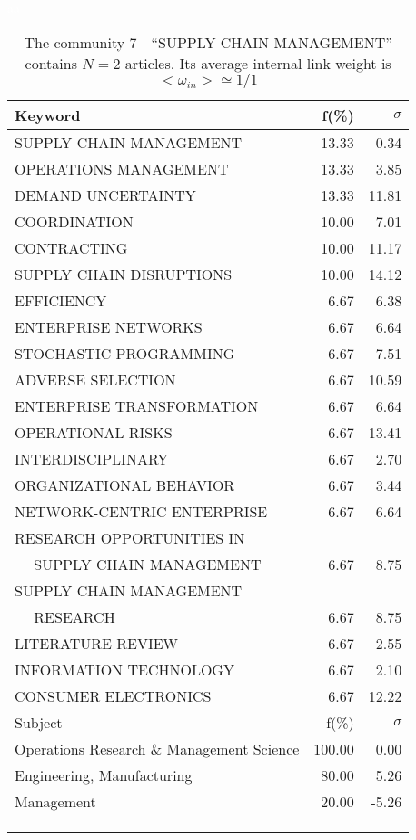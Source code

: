 \documentclass[a4paper,11pt]{report}
\begin{document}
\begin{landscape}
\begin{table}[!ht]
\caption{The community 7 - ``SUPPLY CHAIN MANAGEMENT'' contains $N = 2$ articles. Its average internal link weight is $<\omega_{in}> \simeq 1/1$ }
\textcolor{white}{aa}\\
{\scriptsize\begin{tabular}{|l r r|}
\hline
Keyword & f(\%) & $\sigma$\\
\hline
SUPPLY CHAIN MANAGEMENT & 13.33 & 0.34\\
OPERATIONS MANAGEMENT & 13.33 & 3.85\\
DEMAND UNCERTAINTY & 13.33 & 11.81\\
COORDINATION & 10.00 & 7.01\\
CONTRACTING & 10.00 & 11.17\\
SUPPLY CHAIN DISRUPTIONS & 10.00 & 14.12\\
EFFICIENCY & 6.67 & 6.38\\
ENTERPRISE NETWORKS & 6.67 & 6.64\\
STOCHASTIC PROGRAMMING & 6.67 & 7.51\\
ADVERSE SELECTION & 6.67 & 10.59\\
ENTERPRISE TRANSFORMATION & 6.67 & 6.64\\
OPERATIONAL RISKS & 6.67 & 13.41\\
INTERDISCIPLINARY & 6.67 & 2.70\\
ORGANIZATIONAL BEHAVIOR & 6.67 & 3.44\\
NETWORK-CENTRIC ENTERPRISE & 6.67 & 6.64\\
RESEARCH OPPORTUNITIES IN &  & \\
$\quad$ SUPPLY CHAIN MANAGEMENT & 6.67 & 8.75\\
SUPPLY CHAIN MANAGEMENT &  & \\
$\quad$ RESEARCH & 6.67 & 8.75\\
LITERATURE REVIEW & 6.67 & 2.55\\
INFORMATION TECHNOLOGY & 6.67 & 2.10\\
CONSUMER ELECTRONICS & 6.67 & 12.22\\
\hline
\hline
Subject & f(\%) & $\sigma$\\
\hline
Operations Research \& Management Science & 100.00 & 0.00\\
Engineering, Manufacturing & 80.00 & 5.26\\
Management & 20.00 & -5.26\\
 &  & \\
 &  & \\
 &  & \\

\end{tabular}}
\end{table}
\end{landscape}
\end{document}
